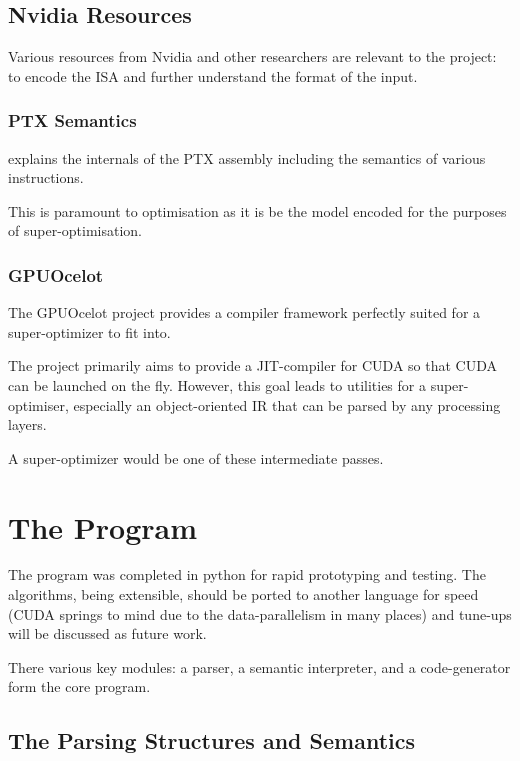 \documentclass[letterpaper,twocolumn,10pt]{article}
\begin{document}
\subsection{Nvidia Resources}

Various resources from Nvidia and other researchers
are relevant to the project:
to encode the ISA and further understand the format
of the input.

\subsubsection{PTX Semantics}

\cite{PTXDoc} explains the internals of the PTX
assembly including the semantics of various
instructions.

This is paramount to optimisation as it is
be the model encoded for the purposes of
super-optimisation.

\subsubsection{GPUOcelot}

The GPUOcelot project \cite{GPUOcelot} provides
a compiler framework perfectly suited for a super-optimizer
to fit into.

The project primarily aims to provide a JIT-compiler for CUDA
so that CUDA can be launched on the fly. However, this goal
leads to utilities for a super-optimiser, especially an object-oriented
IR that can be parsed by any processing layers.

A super-optimizer would be one of these intermediate passes.

\section{The Program}

The program was completed in python for rapid prototyping and testing.
The algorithms, being extensible, should be ported to another language
for speed (CUDA springs to mind due to the data-parallelism in many places)
and tune-ups will be discussed as future work.

There various key modules: a parser, a semantic interpreter, and a code-generator
form the core program.

\subsection{The Parsing Structures and Semantics}
\end{document}
